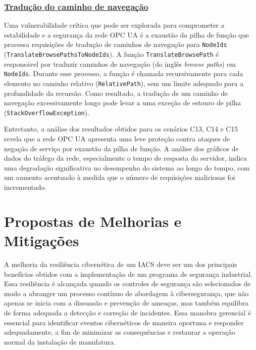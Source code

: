         \subsubsection*{\underline{Tradução do caminho de navegação}}

            Uma vulnerabilidade crítica que pode ser explorada para comprometer a estabilidade e a segurança da rede OPC UA é a exaustão da pilha de função que processa requisições de tradução de caminhos de navegação para \texttt{NodeIds} (\texttt{TranslateBrowsePathsToNodeIds}). A função \texttt{TranslateBrowsePath} é responsável por traduzir caminhos de navegação (do inglês \textit{browse paths}) em \texttt{NodeIds}. Durante esse processo, a função é chamada recursivamente para cada elemento no caminho relativo (\texttt{RelativePath}), sem um limite adequado para a profundidade da recursão. Como resultado, a tradução de um caminho de navegação excessivamente longo pode levar a uma exceção de estouro de pilha (\texttt{StackOverflowException}).

            Entretanto, a análise dos resultados obtidos para os cenários C13, C14 e C15 revela que a rede OPC UA apresenta uma leve proteção contra ataques de negação de serviço por exaustão da pilha de função. A análise dos gráficos de dados do tráfego da rede, especialmente o tempo de resposta do servidor, indica uma degradação significativa no desempenho do sistema ao longo do tempo, com um aumento acentuado à medida que o número de requisições maliciosas foi incrementado.

\section{Propostas de Melhorias e Mitigações} \label{sec:melhorias-mitigacoes}

    A melhoria da resiliência cibernética de um IACS deve ser um dos principais benefícios obtidos com a implementação de um programa de segurança industrial. Essa resiliência é alcançada quando os controles de segurança são selecionados de modo a abranger um processo contínuo de abordagem à cibersegurança, que não apenas se inicia com a dissuasão e prevenção de ameaças, mas também equilibra de forma adequada a detecção e correção de incidentes. Essa manobra gerencial é essencial para identificar eventos cibernéticos de maneira oportuna e responder adequadamente, a fim de minimizar as consequências e restaurar a operação normal da instalação de manufatura.

